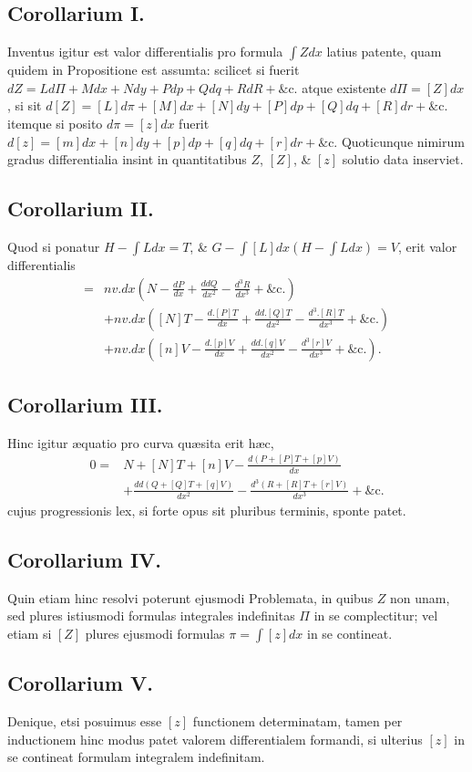 \subsection*{Corollarium I.}
 Inventus igitur est valor differentialis pro formula $\int Zdx$ latius patente, quam quidem in Propositione est assumta: scilicet si fuerit $dZ=Ld\Pi+Mdx+Ndy+Pdp+Qdq+RdR+\text{\&c.}$ atque existente $d\Pi=[Z]dx$, si sit $d[Z]=[L]d\pi+[M]dx+[N]dy+[P]dp+[Q]dq+[R]dr+\text{\&c.}$ itemque si posito $d\pi=[z]dx$ fuerit $d[z]=[m]dx+[n]dy+[p]dp+[q]dq+[r]dr+\text{\&c.}$ Quoticunque nimirum gradus differentialia insint in quantitatibus $Z$, $[Z]$, \& $[z]$ solutio data inserviet.
\subsection*{Corollarium II.}
 Quod si ponatur $H-\int Ldx=T$, \& $G-\int[L]dx(H-\int Ldx)=V$, erit valor differentialis
\[
\begin{aligned}
={}&nv.dx\left(N-\frac{dP}{dx}+\frac{ddQ}{dx^2}-\frac{d^3R}{dx^3}+\text{\&c.}\right)\\
&+nv.dx\left([N]T-\frac{d.[P]T}{dx}+\frac{dd.[Q]T}{dx^2}-\frac{d^3.[R]T}{dx^3}+\text{\&c.}\right)\\
&+nv.dx\left([n]V-\frac{d.[p]V}{dx}+\frac{dd.[q]V}{dx^2}-\frac{d^3[r]V}{dx^3}+\text{\&c.}\right).
\end{aligned}
\]
\subsection*{Corollarium III.}
 Hinc igitur æquatio pro curva quæsita erit hæc,
\[
\begin{aligned}
0={}&N+[N]T+[n]V-\frac{d(P+[P]T+[p]V)}{dx}\\
&+\frac{dd(Q+[Q]T+[q]V)}{dx^2}-\frac{d^3(R+[R]T+[r]V)}{dx^3}+\text{\&c.}
\end{aligned}
\]
cujus progressionis lex, si forte opus sit pluribus terminis, sponte patet.
\subsection*{Corollarium IV.}
 Quin etiam hinc resolvi poterunt ejusmodi Problemata, in quibus $Z$ non unam, sed plures istiusmodi formulas integrales indefinitas $\Pi$ in se complectitur; vel etiam si $[Z]$ plures ejusmodi formulas $\pi=\int[z]dx$ in se contineat.
\subsection*{Corollarium V.}
 Denique, etsi posuimus esse $[z]$ functionem determinatam, tamen per inductionem hinc modus patet valorem differentialem formandi, si ulterius $[z]$ in se contineat formulam integralem indefinitam.
